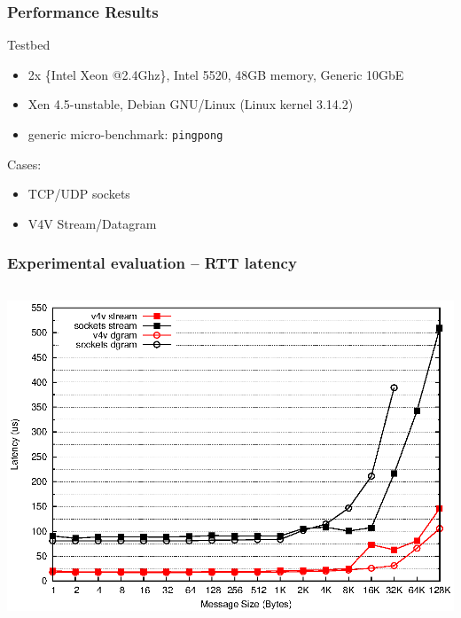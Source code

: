 \documentclass[red,slidestop,notes,compress,mathserif]{beamer}
\begin{document}
\begin{frame}
\frametitle{Performance Results}
\begin{block}{Testbed}
\begin{itemize}
\item 2x \{Intel Xeon @2.4Ghz\}, Intel 5520, 48GB memory, Generic 10GbE
\item Xen 4.5-unstable, Debian GNU/Linux (Linux kernel 3.14.2)
\item generic micro-benchmark: \texttt{pingpong}
\end{itemize}
\end{block}
{Cases:}
\begin{itemize}
\item TCP/UDP sockets
\item V4V Stream/Datagram 
\end{itemize}
\end{frame}


\begin{frame}
\frametitle{Experimental evaluation -- RTT latency}
\begin{columns}
\includegraphics[width=\textwidth]{figures/latencya.eps}
\end{columns}
\end{frame}
\end{document}
